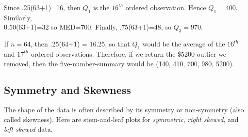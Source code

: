 \documentclass[11pt, chapterprefix=true]{scrbook}\usepackage[]{graphicx}\usepackage[]{color}
\begin{document}
Since .25(63+1)=16, then $Q_1$ is the $16^{th}$ ordered observation.  Hence $Q_1 = 400$.  Similarly, \\ 0.50(63+1)=32 so MED=700.  Finally, .75(63+1)=48, so $Q_3 = 970$.

If $n = 64$, then .25(64+1) = 16.25, so that $Q_1$ would be the average of the $16^{th}$ and $17^{th}$ ordered observations.  Therefore, if we return the \$5200 outlier we removed, then the five-number-summary would be (140, 410, 700, 980, 5200).

\subsection{Symmetry and Skewness}

The shape of the data is often described by its symmetry or non-symmetry (also called skewness).  Here are stem-and-leaf plots for \textit{symmetric}, \textit{right skewed}, and \textit{left-skewed} data.

\vspace{3mm}
\end{document}
